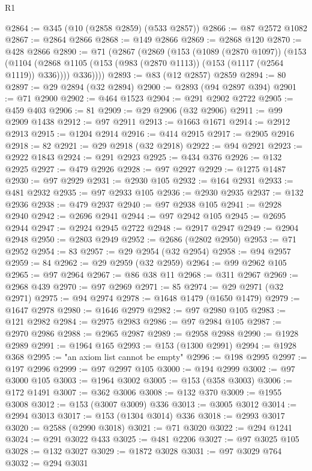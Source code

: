 \begin{lexlean}{R1}
\begin{coremodule}
@2864 := @345 (@10 (@2858 @2859) (@533 @2857))
@2866 := @87 @2572 @1082
@2867 := @2864 @2866
@2868 := @149 @2866
@2869 := @2868 @120
@2870 := @428 @2866
@2890 := @71
    (@2867
      (@2869
        (@153
          (@1089 (@2870 @1097))
          (@153
            (@1104 (@2868 @1105 (@153 (@983 (@2870 @1113)) (@153 (@1117 (@2564 @1119)) @336))))
            @336))))
@2893 := @83 (@12 @2857) @2859
@2894 := 80
@2897 := @29 @2894 (@32 @2894)
@2900 := @2893 (@94 @2897 @394)
@2901 := @71 @2900
@2902 := @464 @1523
@2904 := @291 @2902 @2722
@2905 := @459 @403
@2906 := 81
@2909 := @29 @2906 (@32 @2906)
@2911 := @99 @2909 @1438
@2912 := @97 @2911
@2913 := @1663 @1671
@2914 := @2912 @2913
@2915 := @1204 @2914
@2916 := @414 @2915
@2917 := @2905 @2916
@2918 := 82
@2921 := @29 @2918 (@32 @2918)
@2922 := @94 @2921
@2923 := @2922 @1843
@2924 := @291 @2923
@2925 := @434 @376
@2926 := @132 @2925
@2927 := @479 @2926
@2928 := @97 @2927
@2929 := @1275 @1487
@2930 := @97 @2929
@2931 := @2930 @105
@2932 := @164 @2931
@2933 := @481 @2932
@2935 := @97 @2933 @105
@2936 := @2930 @2935
@2937 := @132 @2936
@2938 := @479 @2937
@2940 := @97 @2938 @105
@2941 := @2928 @2940
@2942 := @2696 @2941
@2944 := @97 @2942 @105
@2945 := @2695 @2944
@2947 := @2924 @2945 @2722
@2948 := @2917 @2947
@2949 := @2904 @2948
@2950 := @2803 @2949
@2952 := @2686 (@2802 @2950)
@2953 := @71 @2952
@2954 := 83
@2957 := @29 @2954 (@32 @2954)
@2958 := @94 @2957
@2959 := 84
@2962 := @29 @2959 (@32 @2959)
@2964 := @99 @2962 @105
@2965 := @97 @2964
@2967 := @86 @38 @11
@2968 := @311 @2967
@2969 := @2968 @439
@2970 := @97 @2969
@2971 := 85
@2974 := @29 @2971 (@32 @2971)
@2975 := @94 @2974
@2978 := @1648 @1479 (@1650 @1479)
@2979 := @1647 @2978
@2980 := @1646 @2979
@2982 := @97 @2980 @105
@2983 := @121 @2982
@2984 := @2975 @2983
@2986 := @97 @2984 @105
@2987 := @2970 @2986
@2988 := @2965 @2987
@2989 := @2958 @2988
@2990 := @1928 @2989
@2991 := @1964 @165
@2993 := @153 (@1300 @2991)
@2994 := @1928 @368
@2995 := "an axiom list cannot be empty"
@2996 := @198 @2995
@2997 := @197 @2996
@2999 := @97 @2997 @105
@3000 := @194 @2999
@3002 := @97 @3000 @105
@3003 := @1964 @3002
@3005 := @153 (@358 @3003)
@3006 := @172 @1491
@3007 := @362 @3006
@3008 := @132 @370
@3009 := @1955 @3008
@3012 := @153 (@3007 @3009) @336
@3013 := @3005 @3012
@3014 := @2994 @3013
@3017 := @153 (@1304 @3014) @336
@3018 := @2993 @3017
@3020 := @2588 (@2990 @3018)
@3021 := @71 @3020
@3022 := @294 @1241
@3024 := @291 @3022 @433
@3025 := @481 @2206
@3027 := @97 @3025 @105
@3028 := @132 @3027
@3029 := @1872 @3028
@3031 := @97 @3029 @764
@3032 := @294 @3031

\end{coremodule}
\end{lexlean}
